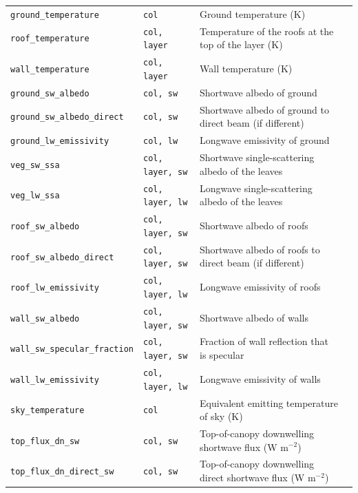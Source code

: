 \documentclass[a4,oneside]{article}
\def\codetabsize{\footnotesize}
\def\codetab#1{{\codetabsize\texttt{#1}}}
\begin{document}
{\begin{longtable}{llLp{8cm}}
\codetab{ground\_temperature} & \codetab{col} & Ground temperature (K) \\
\codetab{roof\_temperature} & \codetab{col, layer} & Temperature of the roofs at the top of the layer (K) \\
\codetab{wall\_temperature} & \codetab{col, layer} & Wall temperature (K) \\
%
\codetab{ground\_sw\_albedo} & \codetab{col, sw} & Shortwave albedo of ground \\
\codetab{ground\_sw\_albedo\_direct} & \codetab{col, sw} & Shortwave albedo of ground to direct beam (if different)\\
\codetab{ground\_lw\_emissivity} & \codetab{col, lw} & Longwave emissivity of ground \\
%
\codetab{veg\_sw\_ssa} & \codetab{col, layer, sw} & Shortwave single-scattering albedo of the leaves \\
\codetab{veg\_lw\_ssa} & \codetab{col, layer, lw} & Longwave single-scattering albedo of the leaves \\
%
\codetab{roof\_sw\_albedo} & \codetab{col, layer, sw} & Shortwave albedo of roofs \\
\codetab{roof\_sw\_albedo\_direct} & \codetab{col, layer, sw} & Shortwave albedo of roofs to direct beam (if different)\\
\codetab{roof\_lw\_emissivity} & \codetab{col, layer, lw} & Longwave emissivity of roofs \\
%
\codetab{wall\_sw\_albedo} & \codetab{col, layer, sw} & Shortwave albedo of walls \\
\codetab{wall\_sw\_specular\_fraction} & \codetab{col, layer, sw} & Fraction of wall reflection that is specular \\
\codetab{wall\_lw\_emissivity} & \codetab{col, layer, lw} & Longwave emissivity of walls \\
%
\codetab{sky\_temperature} & \codetab{col} & Equivalent emitting temperature of sky (K) \\
\codetab{top\_flux\_dn\_sw} & \codetab{col, sw} & Top-of-canopy downwelling shortwave flux (W m$^{-2}$) \\
\codetab{top\_flux\_dn\_direct\_sw} & \codetab{col, sw} & Top-of-canopy downwelling direct shortwave flux (W m$^{-2}$) \\
\hline
\end{longtable}
}
\end{document}
